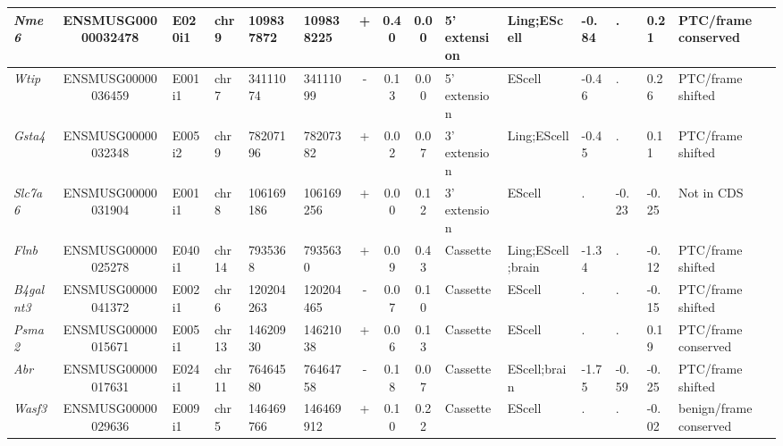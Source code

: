 \begin{appendices}
\begin{landscape}
\begin{table}[htbp]
{\begin{tabular}{|l|c|l|l|l|l|c|c|c|l|l|l|l|l|l|}
		\textit{Nme6} & ENSMUSG00000032478 & E020i1 & chr9  & 109837872 & 109838225 & +     & 0.40  & 0.00  & 5' extension & Ling;EScell & -0.84 & .     & 0.21  & PTC/frame conserved \\ \hline
		\textit{Wtip} & ENSMUSG00000036459 & E001i1 & chr7  & 34111074 & 34111099 & -     & 0.13  & 0.00  & 5' extension & EScell & -0.46 & .     & 0.26  & PTC/frame shifted \\ \hline
		\textit{Gsta4} & ENSMUSG00000032348 & E005i2 & chr9  & 78207196 & 78207382 & +     & 0.02  & 0.07  & 3' extension & Ling;EScell & -0.45 & .     & 0.11  & PTC/frame shifted \\ \hline
		\textit{Slc7a6} & ENSMUSG00000031904 & E001i1 & chr8  & 106169186 & 106169256 & +     & 0.00  & 0.12  & 3' extension & EScell & .     & -0.23 & -0.25 & Not in CDS \\ \hline
		\textit{Flnb} & ENSMUSG00000025278 & E040i1 & chr14 & 7935368 & 7935630 & +     & 0.09  & 0.43  & Cassette & Ling;EScell;brain & -1.34 & .     & -0.12 & PTC/frame shifted \\ \hline
		\textit{B4galnt3} & ENSMUSG00000041372 & E002i1 & chr6  & 120204263 & 120204465 & -     & 0.07  & 0.10  & Cassette & EScell & .     & .     & -0.15 & PTC/frame shifted \\ \hline
		\textit{Psma2} & ENSMUSG00000015671 & E005i1 & chr13 & 14620930 & 14621038 & +     & 0.06  & 0.13  & Cassette & EScell & .     & .     & 0.19  & PTC/frame conserved \\ \hline
		\textit{Abr} & ENSMUSG00000017631 & E024i1 & chr11 & 76464580 & 76464758 & -     & 0.18  & 0.07  & Cassette & EScell;brain & -1.75 & -0.59 & -0.25 & PTC/frame shifted \\ \hline
		\textit{Wasf3} & ENSMUSG00000029636 & E009i1 & chr5  & 146469766 & 146469912 & +     & 0.10  & 0.22  & Cassette & EScell & .     & .     & -0.02 & benign/frame conserved \\ \hline
	\end{tabular}%
	}
\end{table}%

\clearpage


\end{landscape}
\end{appendices}
